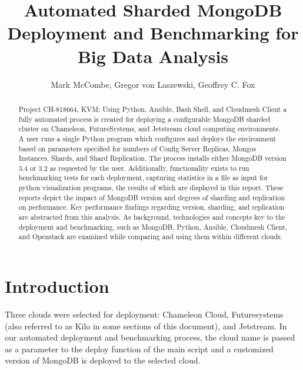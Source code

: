 \documentclass[sigconf]{acmart}
\begin{document}
\title{Automated Sharded MongoDB Deployment and Benchmarking for Big Data Analysis}

\author{Mark McCombe, Gregor von Laszewski, Geoffrey C. Fox}


\begin{abstract}
  Project CH-818664, KVM: 
Using Python, Ansible, Bash Shell, and Cloudmesh Client a fully
automated process is created for deploying a configurable MongoDB
sharded cluster on Chameleon, FutureSystems, and Jetstream cloud
computing environments.  A user runs a single Python program which
configures and deploys the environment based on parameters specified
for numbers of Config Server Replicas, Mongos Instances, Shards, and
Shard Replication.  The process installs either MongoDB version 3.4 or
3.2 as requested by the user.  Additionally, functionality exists to
run benchmarking tests for each deployment, capturing statistics in a
file as input for python visualization programs, the results of which
are displayed in this report.  These reports depict the impact of
MongoDB version and degrees of sharding and replication on
performance. Key performance findings regarding version, sharding, and
replication are abstracted from this analysis.  As background,
technologies and concepts key to the deployment and benchmarking, such
as MongoDB, Python, Ansible, Cloudmesh Client, and Openstack are
examined while comparing and using them within different clouds.
\end{abstract}



\maketitle

\section{Introduction}


Three clouds were selected for deployment: Chameleon Cloud,
Futuresystems (also referred to as Kilo in some sections of this
document), and Jetstream.  In our automated deployment and
benchmarking process, the cloud name is passed as a parameter to the
deploy function of the main script and a customized version
of MongoDB is deployed to the selected cloud.
\end{document}
